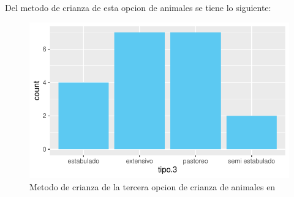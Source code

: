 \documentclass[12pt]{article}\usepackage[]{graphicx}\usepackage[]{xcolor}
\makeatletter
\def\maxwidth{ %
  \ifdim\Gin@nat@width>\linewidth
    \linewidth
  \else
    \Gin@nat@width
  \fi
}
\newenvironment{knitrout}{}{} %
\makeatother
\begin{document}
	Del metodo de crianza de esta opcion de animales se tiene lo siguiente:
	\begin{figure}[H]
	\centering
\begin{knitrout}
\color{fgcolor}
\includegraphics[width=\maxwidth]{figure/twenty_three-1} 
\end{knitrout}
	\caption{Metodo de crianza de la tercera opcion de crianza de animales en \comunidad}
	\end{figure}
	
	
	
\end{document}
